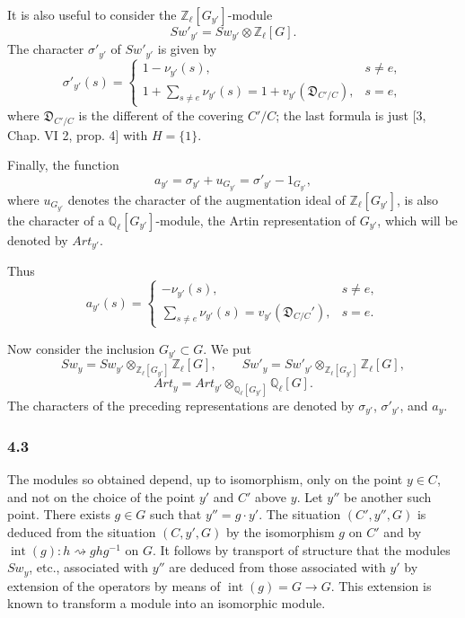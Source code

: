 \documentclass[11pt]{article}
\begin{document}
It is also useful to consider the $\mathbb Z_\ell[G_{y'}]$-module
\[
Sw'_{y'}=Sw_{y'}\otimes\mathbb Z_\ell[G].
\tag{4.2.3}
\]
The character $\sigma'_{y'}$ of $Sw'_{y'}$ is given by
\[
\sigma'_{y'}(s)=
\begin{cases}
1-\nu_{y'}(s),& s\ne e,\\[0.4em]
\displaystyle 1+\sum_{s\ne e}\nu_{y'}(s)
=1+v_{y'}(\mathfrak D_{C'/C}),& s=e,
\end{cases}
\tag{4.2.4}
\]
where $\mathfrak D_{C'/C}$ is the different of the covering $C'/C$; the last formula is just [3, Chap. VI 2, prop. 4] with $H=\{1\}$.

Finally, the function
\[
a_{y'}=\sigma_{y'}+u_{G_{y'}}=\sigma'_{y'}-1_{G_{y'}},
\tag{4.2.5}
\]
where $u_{G_{y'}}$ denotes the character of the augmentation ideal of $\mathbb Z_\ell[G_{y'}]$, is also the character of a $\mathbb Q_\ell[G_{y'}]$-module, the Artin representation of $G_{y'}$, which will be denoted by $Art_{y'}$.

Thus
\[
a_{y'}(s)=
\begin{cases}
-\nu_{y'}(s),& s\ne e,\\[0.4em]
\displaystyle\sum_{s\ne e}\nu_{y'}(s)=v_{y'}(\mathfrak D_{C/C}'),& s=e.
\end{cases}
\tag{4.2.6}
\]

Now consider the inclusion $G_{y'}\subset G$. We put
\[
Sw_y=Sw_{y'}\otimes_{\mathbb Z_\ell[G_{y'}]}\mathbb Z_\ell[G],
\qquad
Sw'_y=Sw'_{y'}\otimes_{\mathbb Z_\ell[G_{y'}]}\mathbb Z_\ell[G],
\tag{4.2.7}
\]
\[
Art_y=Art_{y'}\otimes_{\mathbb Q_\ell[G_{y'}]}\mathbb Q_\ell[G].
\tag{4.2.8}
\]
The characters of the preceding representations are denoted by $\sigma_{y'}$, $\sigma'_{y'}$, and $a_y$.

\subsubsection*{4.3}

The modules so obtained depend, up to isomorphism, only on the point $y\in C$, and not on the choice of the point $y'$ and $C'$ above $y$. Let $y''$ be another such point. There exists $g\in G$ such that $y''=g\cdot y'$. The situation $(C',y'',G)$ is deduced from the situation $(C,y',G)$ by the isomorphism $g$ on $C'$ and by $\operatorname{int}(g):h\rightsquigarrow ghg^{-1}$ on $G$. It follows by transport of structure that the modules $Sw_y$, etc., associated with $y''$ are deduced from those associated with $y'$ by extension of the operators by means of $\operatorname{int}(g)=G\to G$. This extension is known to transform a module into an isomorphic module.
\end{document}
